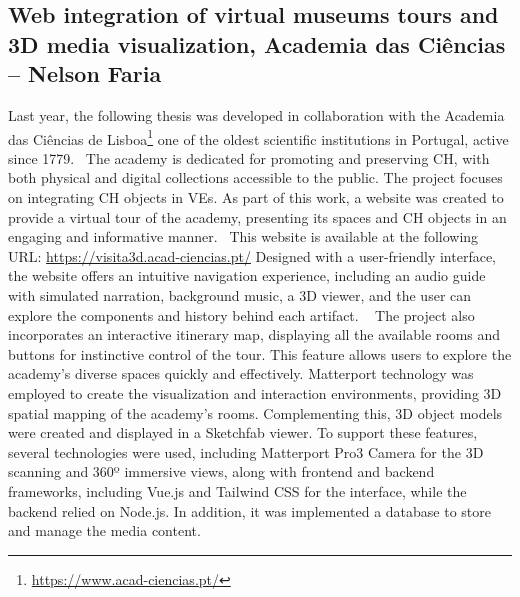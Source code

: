 \subsection{Web integration of virtual museums tours and \gls{3D} media visualization, Academia das Ciências – Nelson Faria}
\label{sec:thesis3_nova}

Last year, the following thesis was developed in collaboration with the Academia das Ciências de Lisboa\footnote{\url{https://www.acad-ciencias.pt/}} one of the oldest scientific institutions in Portugal, active since 1779.~\cite{tecnicoAcademia} 
The academy is dedicated for promoting and preserving \gls{CH}, with both physical and digital collections accessible to the public. 
The project focuses on integrating \gls{CH} objects in \glspl{VE}. As part of this work, a website was created to provide a virtual tour of the academy, presenting its spaces and \gls{CH} objects in an engaging and informative manner.~\cite{tese_tourFaria2024} 
This website is available at the following URL: \url{https://visita3d.acad-ciencias.pt/} 
Designed with a user-friendly interface, the website offers an intuitive navigation experience, including an audio guide with simulated narration, background music, a \gls{3D} viewer, and the user can explore the components and history behind each artifact. 
~\cite{academiaCiencias2024} The project also incorporates an interactive itinerary map, displaying all the available rooms and buttons for instinctive control of the tour. This feature allows users to explore the academy's diverse spaces quickly and effectively.
Matterport technology was employed to create the visualization and interaction environments, providing \gls{3D} spatial mapping of the academy's rooms. Complementing this, \gls{3D} object models were created and displayed in a Sketchfab viewer. 
To support these features, several technologies were used, including Matterport Pro3 Camera for the \gls{3D} scanning and 360º immersive views, along with frontend and backend frameworks, including Vue.js and Tailwind CSS for the interface, 
while the backend relied on Node.js. In addition, it was implemented a database to store and manage the media content.
